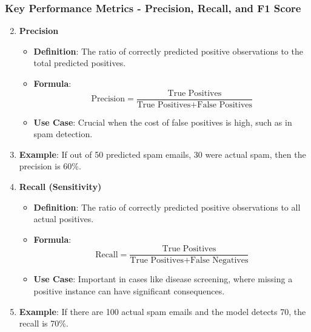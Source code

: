 \documentclass[aspectratio=169]{beamer}
\begin{document}
\begin{frame}[fragile]
    \frametitle{Key Performance Metrics - Precision, Recall, and F1 Score}
    \begin{enumerate}
        \setcounter{enumi}{1}
        \item \textbf{Precision}
        \begin{itemize}
            \item \textbf{Definition}: The ratio of correctly predicted positive observations to the total predicted positives.
            \item \textbf{Formula}:
            \begin{equation}
                \text{Precision} = \frac{\text{True Positives}}{\text{True Positives} + \text{False Positives}}
            \end{equation}
            \item \textbf{Use Case}: Crucial when the cost of false positives is high, such as in spam detection.
        \end{itemize}
        \item \textbf{Example}: If out of 50 predicted spam emails, 30 were actual spam, then the precision is 60\%.
        
        \item \textbf{Recall (Sensitivity)}
        \begin{itemize}
            \item \textbf{Definition}: The ratio of correctly predicted positive observations to all actual positives.
            \item \textbf{Formula}:
            \begin{equation}
                \text{Recall} = \frac{\text{True Positives}}{\text{True Positives} + \text{False Negatives}}
            \end{equation}
            \item \textbf{Use Case}: Important in cases like disease screening, where missing a positive instance can have significant consequences.
        \end{itemize}
        \item \textbf{Example}: If there are 100 actual spam emails and the model detects 70, the recall is 70\%.
    \end{enumerate}
\end{frame}
\end{document}
